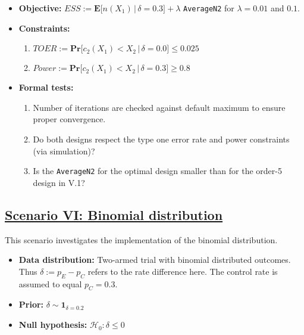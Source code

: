 \documentclass[
]{book}
\providecommand{\tightlist}{%
  \setlength{\itemsep}{0pt}\setlength{\parskip}{0pt}}
\begin{document}
\begin{itemize}
\tightlist
\item
  \textbf{Objective:} \(ESS := \boldsymbol{E}\big[n(X_1)\,|\,\delta=0.3\big] + \lambda\) \texttt{AverageN2}
  for \(\lambda = 0.01\) and \(0.1\).
\item
  \textbf{Constraints:}

  \begin{enumerate}
  \def\labelenumi{\arabic{enumi}.}
  \tightlist
  \item
    \(TOER := \boldsymbol{Pr}\big[c_2(X_1) < X_2\,|\,\delta=0.0\big] \leq 0.025\)
  \item
    \(Power := \boldsymbol{Pr}\big[c_2(X_1) < X_2\,|\,\delta=0.3\big] \geq 0.8\)
  \end{enumerate}
\item
  \textbf{Formal tests:}

  \begin{enumerate}
  \def\labelenumi{\arabic{enumi}.}
  \tightlist
  \item
    Number of iterations are checked against default maximum to ensure proper
    convergence.
  \item
    Do both designs respect the type one error rate and power
    constraints (via simulation)?
  \item
    Is the \texttt{AverageN2} for the optimal design smaller than for the order-5
    design in V.1?
  \end{enumerate}
\end{itemize}

\hypertarget{scenario-vi-binomial-distribution}{%
\subsection{\texorpdfstring{\protect\hyperlink{scenarioVI}{Scenario VI: Binomial distribution}}{Scenario VI: Binomial distribution}}\label{scenario-vi-binomial-distribution}}

This scenario investigates the implementation of the binomial distribution.

\begin{itemize}
\tightlist
\item
  \textbf{Data distribution:} Two-armed trial with binomial distributed outcomes.
  Thus \(\delta := p_E - p_C\) refers to the rate difference here.
  The control rate is assumed to equal \(p_C = 0.3\).
\item
  \textbf{Prior:} \(\delta\sim\textbf{1}_{\delta=0.2}\)
\item
  \textbf{Null hypothesis:} \(\mathcal{H}_0:\delta \leq 0\)
\end{itemize}
\end{document}
